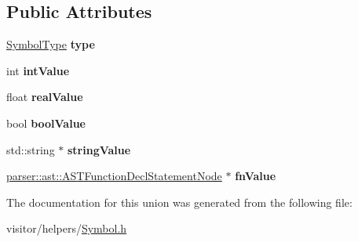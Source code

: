 \subsection*{Public Attributes}
\begin{DoxyCompactItemize}
\item 
\mbox{\label{unionvisitor_1_1helper_1_1Symbol_1_1Value_a455ae42d21bb23c0ac55bd39f70290ac}} 
\hyperlink{ASTVariableDeclStatementNode_8h_a1e8e1bde0729627e3a22ffa858d5f3b9}{Symbol\+Type} {\bfseries type}
\item 
\mbox{\label{unionvisitor_1_1helper_1_1Symbol_1_1Value_a7e5eb07f48a6090f4aad1eb6c261defa}} 
int {\bfseries int\+Value}
\item 
\mbox{\label{unionvisitor_1_1helper_1_1Symbol_1_1Value_a40869bfc0a5cde4cf88668cca43a2053}} 
float {\bfseries real\+Value}
\item 
\mbox{\label{unionvisitor_1_1helper_1_1Symbol_1_1Value_ac81528d53da0b9f970520afe6aa6bbc7}} 
bool {\bfseries bool\+Value}
\item 
\mbox{\label{unionvisitor_1_1helper_1_1Symbol_1_1Value_ac2875db8ede4a0047ea055c6e4c9916f}} 
std\+::string $\ast$ {\bfseries string\+Value}
\item 
\mbox{\label{unionvisitor_1_1helper_1_1Symbol_1_1Value_aea7d5942c94094aa262f6ab3100c3905}} 
\hyperlink{classparser_1_1ast_1_1ASTFunctionDeclStatementNode}{parser\+::ast\+::\+A\+S\+T\+Function\+Decl\+Statement\+Node} $\ast$ {\bfseries fn\+Value}
\end{DoxyCompactItemize}


The documentation for this union was generated from the following file\+:\begin{DoxyCompactItemize}
\item 
visitor/helpers/\hyperlink{Symbol_8h}{Symbol.\+h}\end{DoxyCompactItemize}
